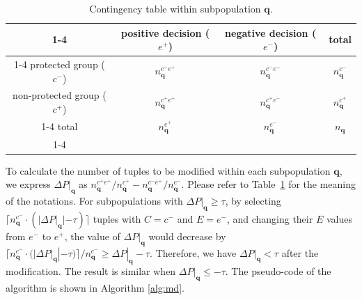 \documentclass[twoside,leqno,twocolumn]{article}
\begin{document}

\setlength{\tabcolsep}{2.5pt}

\begin{table}[htb]
\scriptsize
\centering
\caption{Contingency table within subpopulation $\mathbf{q}$.}
\begin{tabular}{c c c c}
\cline{1-4}
& positive decision ($e^{+}$) & negative decision ($e^{-}$) & total \\
\cline{1-4}
protected group ($c^{-}$) & $n_{\mathbf{q}}^{c^{-}e^{+}}$ & $n_{\mathbf{q}}^{c^{-}e^{-}}$ & $n_{\mathbf{q}}^{c^{-}}$ \\
non-protected group ($c^{+}$) & $n_{\mathbf{q}}^{c^{+}e^{+}}$ & $n_{\mathbf{q}}^{c^{+}e^{-}}$ & $n_{\mathbf{q}}^{c^{+}}$ \\
\cline{1-4}
total & $n_{\mathbf{q}}^{e^{+}}$ & $n_{\mathbf{q}}^{e^{-}}$ & $n_{\mathbf{q}}$\\
\cline{1-4}
\end{tabular}
\label{tab:contingencyTable}
\end{table}

To calculate the number of tuples to be modified within each subpopulation $\mathbf{q}$, we express $\Delta P|_{\mathbf{q}}$ as $n_{\mathbf{q}}^{c^{+}e^{+}}/n_{\mathbf{q}}^{c^{+}}-n_{\mathbf{q}}^{c^{-}e^{+}}/n_{\mathbf{q}}^{c^{-}}$. Please refer to Table~\ref{tab:contingencyTable} for the meaning of the notations. For subpopulations with $\Delta P|_{\mathbf{q}}\geq \tau$, by selecting $\lceil n_{\mathbf{q}}^{c^{-}}\cdot (|\Delta P|_{\mathbf{q}}|-\tau) \rceil$ tuples with $C=c^{-}$ and $E=e^{-}$, and changing their $E$ values from $e^{-}$ to $e^{+}$, the value of $\Delta P|_{\mathbf{q}}$ would decrease by $\lceil n_{\mathbf{q}}^{c^{-}}\cdot (|\Delta P|_{\mathbf{q}}|-\tau)\rceil / n_{\mathbf{q}}^{c^{-}} \geq \Delta P|_{\mathbf{q}}-\tau$. Therefore, we have $\Delta P|_{\mathbf{q}} < \tau$ after the modification. The result is similar when $\Delta P|_{\mathbf{q}}\leq -\tau$. The pseudo-code of the algorithm is shown in Algorithm \ref{alg:md}.
\end{document}
